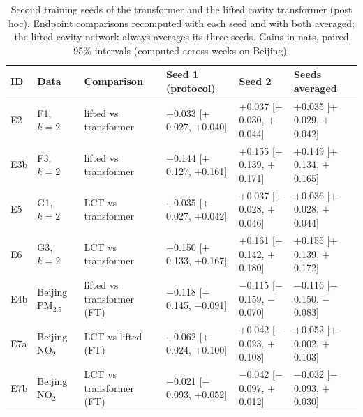 \begin{table}[t]
\centering\footnotesize
\setlength{\tabcolsep}{2pt}
\caption{\label{tab:seeds}Second training seeds of the transformer and the lifted cavity transformer (post hoc). Endpoint comparisons recomputed with each seed and with both averaged; the lifted cavity network always averages its three seeds. Gains in nats, paired 95\% intervals (computed across weeks on Beijing).}
\begin{tabular}{llllll}
\toprule
ID & Data & Comparison & Seed 1 (protocol) & Seed 2 & Seeds averaged\\
\midrule
E2 & F1, $k=2$ & lifted vs transformer & $+$0.033 [$+$0.027, $+$0.040] & $+$0.037 [$+$0.030, $+$0.044] & $+$0.035 [$+$0.029, $+$0.042]\\
E3b & F3, $k=2$ & lifted vs transformer & $+$0.144 [$+$0.127, $+$0.161] & $+$0.155 [$+$0.139, $+$0.171] & $+$0.149 [$+$0.134, $+$0.165]\\
E5 & G1, $k=2$ & LCT vs transformer & $+$0.035 [$+$0.027, $+$0.042] & $+$0.037 [$+$0.028, $+$0.046] & $+$0.036 [$+$0.028, $+$0.044]\\
E6 & G3, $k=2$ & LCT vs transformer & $+$0.150 [$+$0.133, $+$0.167] & $+$0.161 [$+$0.142, $+$0.180] & $+$0.155 [$+$0.139, $+$0.172]\\
E4b & Beijing PM$_{2.5}$ & lifted vs transformer (FT) & $-$0.118 [$-$0.145, $-$0.091] & $-$0.115 [$-$0.159, $-$0.070] & $-$0.116 [$-$0.150, $-$0.083]\\
E7a & Beijing NO$_2$ & LCT vs lifted (FT) & $+$0.062 [$+$0.024, $+$0.100] & $+$0.042 [$-$0.023, $+$0.108] & $+$0.052 [$+$0.002, $+$0.103]\\
E7b & Beijing NO$_2$ & LCT vs transformer (FT) & $-$0.021 [$-$0.093, $+$0.052] & $-$0.042 [$-$0.097, $+$0.012] & $-$0.032 [$-$0.093, $+$0.030]\\
\bottomrule
\end{tabular}
\end{table}
